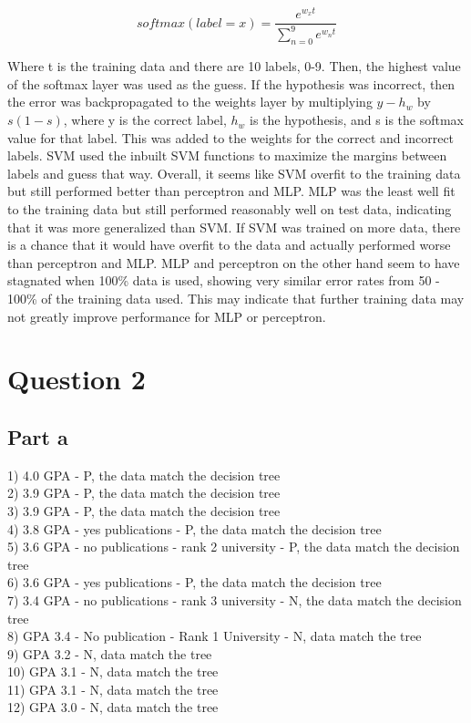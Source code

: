 \documentclass[12pt]{article}
\begin{document}
\begin{equation}
softmax(label = x) = \frac{e^{w_xt}}{\sum_{n=0}^{9}e^{w_nt}}
\end{equation}

Where t is the training data and there are 10 labels, 0-9. Then, the highest value of the softmax layer was used as the guess. If the hypothesis was incorrect, then the error was backpropagated to the weights layer by multiplying $y - h_w$ by $s(1-s)$, where y is the correct label, $h_w$ is the hypothesis, and s is the softmax value for that label. This was added to the weights for the correct and incorrect labels. SVM used the inbuilt SVM functions to maximize the margins between labels and guess that way. Overall, it seems like SVM overfit to the training data but still performed better than perceptron and MLP. MLP was the least well fit to the training data but still performed reasonably well on test data, indicating that it was more generalized than SVM. If SVM was trained on more data, there is a chance that it would have overfit to the data and actually performed worse than perceptron and MLP. MLP and perceptron on the other hand seem to have stagnated when 100\% data is used, showing very similar error rates from 50 - 100\% of the training data used. This may indicate that further training data may not greatly improve performance for MLP or perceptron.

\section*{Question 2}

\subsection*{Part a}

1) 4.0 GPA - P, the data match the decision tree\\
2) 3.9 GPA - P, the data match the decision tree\\
3) 3.9 GPA - P, the data match the decision tree\\
4) 3.8 GPA - yes publications - P, the data match the decision tree\\
5) 3.6 GPA - no publications - rank 2 university - P, the data match the decision tree\\
6) 3.6 GPA - yes publications - P, the data match the decision tree\\
7) 3.4 GPA - no publications - rank 3 university - N, the data match the decision tree\\
8) GPA 3.4 - No publication - Rank 1 University - N, data match the tree\\
9) GPA 3.2 - N, data match the tree\\
10) GPA 3.1 - N, data match the tree\\
11) GPA 3.1 - N, data match the tree\\
12) GPA 3.0 - N, data match the tree\\
\end{document}
